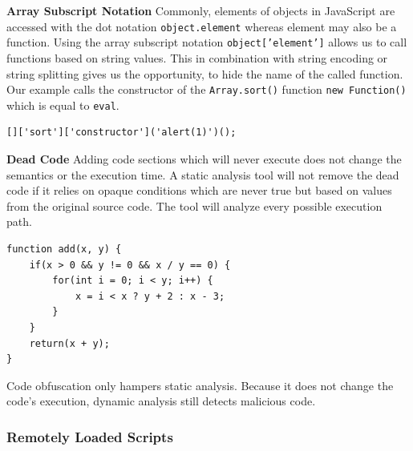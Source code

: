 \begin{itemize}
					\begin{minipage}{\leftside}
						\item \textbf{Array Subscript Notation} Commonly, elements of objects in JavaScript are accessed with the dot notation \texttt{object.element} whereas element may also be a function. Using the array subscript notation \texttt{object['element']} allows us to call functions based on string values. This in combination with string encoding or string splitting gives us the opportunity, to hide the name of the called function. Our example calls the constructor of the \texttt{Array.sort()} function \texttt{new Function()} which is equal to \texttt{eval}.
					\end{minipage} \hspace{1em}
					\begin{minipage}{\rightside}
						\begin{lstlisting}
[]['sort']['constructor']('alert(1)')();\end{lstlisting}
					\end{minipage} 	
						
					\begin{minipage}{\leftside}
						\item \textbf{Dead Code} Adding code sections which will never execute does not change the semantics or the execution time. A static analysis tool will not remove the dead code if it relies on opaque conditions which are never true but based on values from the original source code. The tool will analyze every possible execution path. 
					\end{minipage} \hspace{1em}
					\begin{minipage}{\rightside}	
						\begin{lstlisting}
function add(x, y) {
	if(x > 0 && y != 0 && x / y == 0) {
		for(int i = 0; i < y; i++) {
			x = i < x ? y + 2 : x - 3;
		}
	}
	return(x + y);
}\end{lstlisting}
					\end{minipage} 									
			\end{itemize}
			
			Code obfuscation only hampers static analysis. Because it does not change the code's execution, dynamic analysis still detects malicious code.
		
		\subsubsection{Remotely Loaded Scripts}
			
